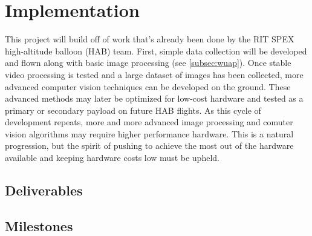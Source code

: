 \documentclass[conference]{IEEEtran} %
\begin{document}
\section{Implementation}
\label{sec:implementation}
This project will build off of work that's already been done by the RIT SPEX high-altitude balloon (HAB) team.
First, simple data collection will be developed and flown along with basic image processing (see \autoref{subsec:wuap}).
Once stable video processing is tested and a large dataset of images has been collected, more advanced computer vision techniques can be developed on the ground.
These advanced methods may later be optimized for low-cost hardware and tested as a primary or secondary payload on future HAB flights.
As this cycle of development repeats, more and more advanced image processing and comuter vision algorithms may require higher performance hardware.
This is a natural progression, but the spirit of pushing to achieve the most out of the hardware available and keeping hardware costs low must be upheld.


\subsection{Deliverables}
\label{subsec:deliverables}


\subsection{Milestones}
\label{subsec:milestones}
\end{document}
